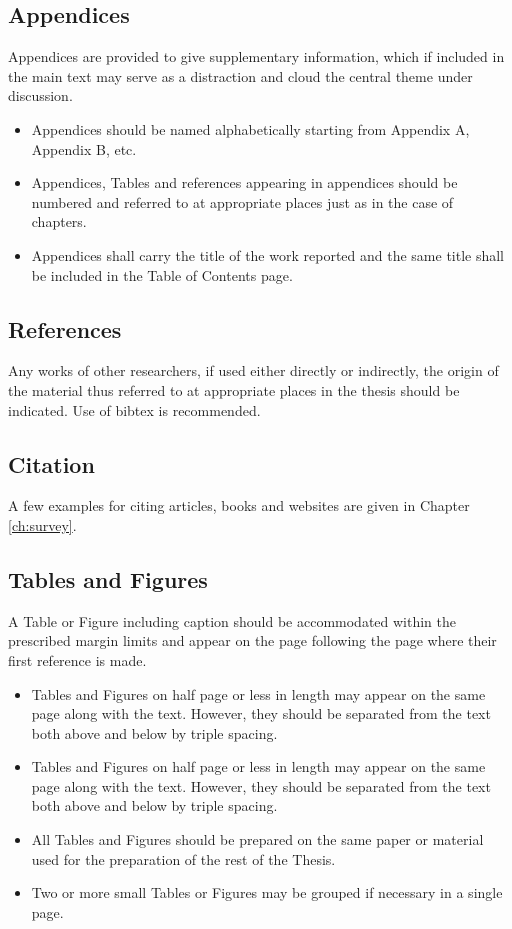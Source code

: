\subsection{Appendices}
Appendices are provided to give supplementary information, which if included in the main text may serve as a distraction and cloud the central theme under discussion.
\begin{itemize}
 \item Appendices should be named alphabetically starting from Appendix A, Appendix B, etc.
\item  Appendices, Tables and references appearing in appendices should be numbered and referred to at appropriate places just as in the case of chapters.
\item Appendices shall carry the title of the work reported and the same title shall be included in the Table of Contents page.
\end{itemize}
\subsection{References}
Any works of other researchers, if used either directly or indirectly, the origin of the material thus referred to at appropriate places in the thesis should be indicated. Use of bibtex is recommended.
\subsection{Citation}
A few examples for citing articles, books and websites are given in Chapter \ref{ch:survey}.
\subsection{Tables and Figures}
A Table or Figure including caption should be accommodated within the prescribed margin limits and appear on the page following the page where their first reference is made.
\begin{itemize}
 \item Tables and Figures on half page or less in length may appear on the same page along with the text. However, they should be separated from the text both above and below by triple spacing.
\item Tables and Figures on half page or less in length may appear on the same page along with the text. However, they should be separated from the text both above and below by triple spacing.
\item All Tables and Figures should be prepared on the same paper or material used for the preparation of the rest of the Thesis.
\item Two or more small Tables or Figures may be grouped if necessary in a single page.
\end{itemize}
